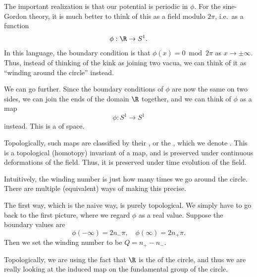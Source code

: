 \documentclass[a4paper]{article}
\begin{document}
The important realization is that our potential is periodic in $\phi$. For the sine-Gordon theory, it is much better to think of this as a field modulo $2\pi$, i.e.\ as a function
\[
  \phi: \R \to S^1.
\]
In this language, the boundary condition is that $\phi(x) = 0 \bmod 2\pi$ as $x \to \pm \infty$. Thus, instead of thinking of the kink as joining two vacua, we can think of it as ``winding around the circle'' instead.

We can go further. Since the boundary conditions of $\phi$ are now the same on two sides, we can join the ends of the domain $\R$ together, and we can think of $\phi$ as a map
\[
  \phi: S^1 \to S^1
\]
instead. This is a  of space.

Topologically, such maps are classified by their , or the , which we denote . This is a topological (homotopy) invariant of a map, and is preserved under continuous deformations of the field. Thus, it is preserved under time evolution of the field.

Intuitively, the winding number is just how many times we go around the circle. There are multiple (equivalent) ways of making this precise.

The first way, which is the naive way, is purely topological. We simply have to go back to the first picture, where we regard $\phi$ as a real value. Suppose the boundary values are
\[
  \phi(-\infty) = 2 n_- \pi,\quad \phi(\infty) = 2 n_+ \pi.
\]
Then we set the winding number to be $Q = n_+ - n_-$.

Topologically, we are using the fact that $\R$ is the  of the circle, and thus we are really looking at the induced map on the fundamental group of the circle.
\end{document}

